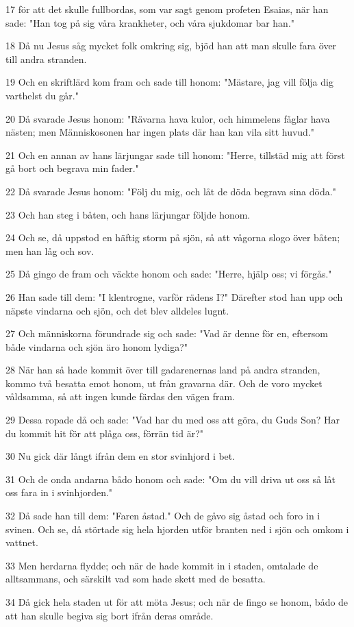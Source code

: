 \par 17 för att det skulle fullbordas, som var sagt genom profeten Esaias, när han sade: "Han tog på sig våra krankheter, och våra sjukdomar bar han."
\par 18 Då nu Jesus såg mycket folk omkring sig, bjöd han att man skulle fara över till andra stranden.
\par 19 Och en skriftlärd kom fram och sade till honom: "Mästare, jag vill följa dig varthelst du går."
\par 20 Då svarade Jesus honom: "Rävarna hava kulor, och himmelens fåglar hava nästen; men Människosonen har ingen plats där han kan vila sitt huvud."
\par 21 Och en annan av hans lärjungar sade till honom: "Herre, tillstäd mig att först gå bort och begrava min fader."
\par 22 Då svarade Jesus honom: "Följ du mig, och låt de döda begrava sina döda."
\par 23 Och han steg i båten, och hans lärjungar följde honom.
\par 24 Och se, då uppstod en häftig storm på sjön, så att vågorna slogo över båten; men han låg och sov.
\par 25 Då gingo de fram och väckte honom och sade: "Herre, hjälp oss; vi förgås."
\par 26 Han sade till dem: "I klentrogne, varför rädens I?" Därefter stod han upp och näpste vindarna och sjön, och det blev alldeles lugnt.
\par 27 Och människorna förundrade sig och sade: "Vad är denne för en, eftersom både vindarna och sjön äro honom lydiga?"
\par 28 När han så hade kommit över till gadarenernas land på andra stranden, kommo två besatta emot honom, ut från gravarna där. Och de voro mycket våldsamma, så att ingen kunde färdas den vägen fram.
\par 29 Dessa ropade då och sade: "Vad har du med oss att göra, du Guds Son? Har du kommit hit för att plåga oss, förrän tid är?"
\par 30 Nu gick där långt ifrån dem en stor svinhjord i bet.
\par 31 Och de onda andarna bådo honom och sade: "Om du vill driva ut oss så låt oss fara in i svinhjorden."
\par 32 Då sade han till dem: "Faren åstad." Och de gåvo sig åstad och foro in i svinen. Och se, då störtade sig hela hjorden utför branten ned i sjön och omkom i vattnet.
\par 33 Men herdarna flydde; och när de hade kommit in i staden, omtalade de alltsammans, och särskilt vad som hade skett med de besatta.
\par 34 Då gick hela staden ut för att möta Jesus; och när de fingo se honom, bådo de att han skulle begiva sig bort ifrån deras område.

